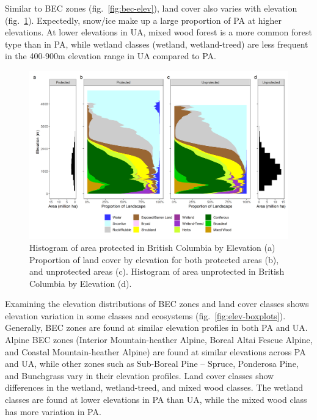 \documentclass[10pt,oneside]{article}
\makeatletter
\def\maxwidth{\ifdim\Gin@nat@width>\linewidth\linewidth
\else\Gin@nat@width\fi}
\let\Oldincludegraphics\includegraphics
\renewcommand{\includegraphics}[1]{\Oldincludegraphics[width=\maxwidth]{#1}}
\makeatother
\begin{document}
Similar to BEC zones (fig.~\ref{fig:bec-elev}), land cover also varies
with elevation (fig.~\ref{fig:lcc-elev}). Expectedly, snow/ice make up a
large proportion of PA at higher elevations. At lower elevations in UA,
mixed wood forest is a more common forest type than in PA, while wetland
classes (wetland, wetland-treed) are less frequent in the 400-900m
elevation range in UA compared to PA.

\begin{figure}
\hypertarget{fig:lcc-elev}{%
\centering
\includegraphics{figures/lcc_elev_hist.png}
\caption{Histogram of area protected in British Columbia by Elevation
(a) Proportion of land cover by elevation for both protected areas (b),
and unprotected areas (c). Histogram of area unprotected in British
Columbia by Elevation (d).}\label{fig:lcc-elev}
}
\end{figure}

Examining the elevation distributions of BEC zones and land cover
classes shows elevation variation in some classes and ecosystems
(fig.~\ref{fig:elev-boxplots}). Generally, BEC zones are found at
similar elevation profiles in both PA and UA. Alpine BEC zones (Interior
Mountain-heather Alpine, Boreal Altai Fescue Alpine, and Coastal
Mountain-heather Alpine) are found at similar elevations across PA and
UA, while other zones such as Sub-Boreal Pine -- Spruce, Ponderosa Pine,
and Bunchgrass vary in their elevation profiles. Land cover classes show
differences in the wetland, wetland-treed, and mixed wood classes. The
wetland classes are found at lower elevations in PA than UA, while the
mixed wood class has more variation in PA.
\end{document}
